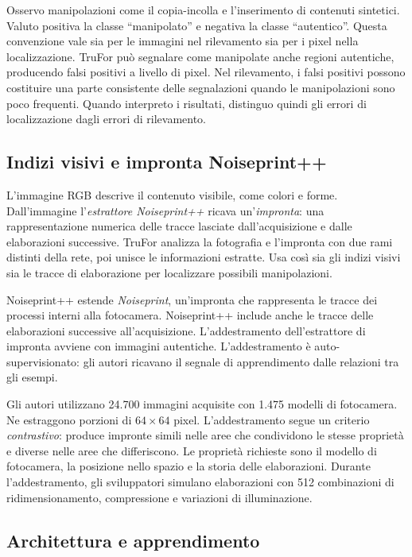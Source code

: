 Osservo manipolazioni come il copia-incolla e l'inserimento di contenuti sintetici. Valuto positiva la classe ``manipolato'' e negativa la classe ``autentico''. Questa convenzione vale sia per le immagini nel rilevamento sia per i pixel nella localizzazione. TruFor può segnalare come manipolate anche regioni autentiche, producendo falsi positivi a livello di pixel. Nel rilevamento, i falsi positivi possono costituire una parte consistente delle segnalazioni quando le manipolazioni sono poco frequenti. Quando interpreto i risultati, distinguo quindi gli errori di localizzazione dagli errori di rilevamento.

\subsection{Indizi visivi e impronta Noiseprint++}
\label{subsec:background-noiseprint}

L'immagine RGB descrive il contenuto visibile, come colori e forme. Dall'immagine l'\emph{estrattore Noiseprint++} ricava un'\emph{impronta}: una rappresentazione numerica delle tracce lasciate dall'acquisizione e dalle elaborazioni successive. TruFor analizza la fotografia e l'impronta con due rami distinti della rete, poi unisce le informazioni estratte. Usa così sia gli indizi visivi sia le tracce di elaborazione per localizzare possibili manipolazioni.

Noiseprint++ estende \emph{Noiseprint}, un'impronta che rappresenta le tracce dei processi interni alla fotocamera. Noiseprint++ include anche le tracce delle elaborazioni successive all'acquisizione. L'addestramento dell'estrattore di impronta avviene con immagini autentiche. L'addestramento è auto-supervisionato: gli autori ricavano il segnale di apprendimento dalle relazioni tra gli esempi.

Gli autori utilizzano 24.700 immagini acquisite con 1.475 modelli di fotocamera. Ne estraggono porzioni di $64 \times 64$ pixel. L'addestramento segue un criterio \emph{contrastivo}: produce impronte simili nelle aree che condividono le stesse proprietà e diverse nelle aree che differiscono. Le proprietà richieste sono il modello di fotocamera, la posizione nello spazio e la storia delle elaborazioni. Durante l'addestramento, gli sviluppatori simulano elaborazioni con 512 combinazioni di ridimensionamento, compressione e variazioni di illuminazione.

\subsection{Architettura e apprendimento}
\label{subsec:background-trufor-architettura}

